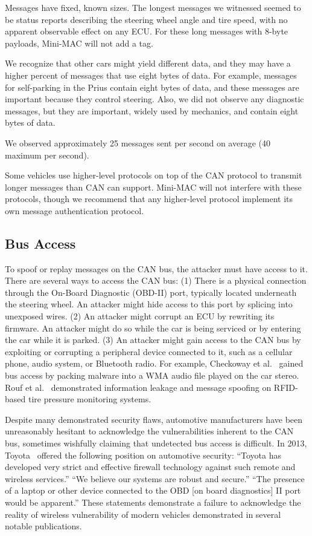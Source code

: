 Messages have fixed, known sizes.  The longest messages we witnessed
seemed to be status reports describing the steering wheel angle and tire speed,
with no apparent observable effect on any ECU.
For these long messages with 8-byte payloads,  Mini-MAC will not add a tag. 

We recognize that other cars might yield different data, and they may have a higher percent of
messages that use eight bytes of data.  For example, messages for
self-parking in the Prius contain eight bytes of data, and these messages are
important because they control steering. Also, we did not observe any diagnostic messages,
but they are important, widely used by mechanics, and contain eight bytes of data.

We observed approximately 25 messages sent per second on average (40 maximum per second).

Some vehicles use higher-level protocols on top of the 
CAN protocol to transmit longer messages than CAN can support. 
Mini-MAC will not interfere with these protocols, 
though we recommend that any higher-level 
protocol implement its own message authentication protocol.

\subsection{Bus Access}
\label{access}

To spoof or replay messages on the CAN bus, the attacker must have access to it.
There are several ways to access the CAN bus:  (1) There is a
physical connection through the On-Board Diagnostic (OBD-II) port, 
typically located underneath the steering wheel.  An attacker might hide
access to this port by splicing into unexposed wires.
(2) An attacker might corrupt an ECU by rewriting its firmware. An attacker might
do so while the car is being serviced or by entering the car while it is parked.
(3) An attacker might gain access to the CAN bus by exploiting or corrupting a peripheral
device connected to it, such as a cellular phone, audio system, or Bluetooth
radio.  For example, Checkoway et al.~\cite{Checkoway-2011} gained bus access by packing 
malware into a WMA audio file played on the car stereo. 
Rouf et al.~\cite{Rouf2010} demonstrated information leakage and message spoofing on RFID-based tire pressure monitoring systems.

Despite many demonstrated security flaws, automotive 
manufacturers have been unreasonably hesitant to acknowledge the vulnerabilities inherent to the CAN bus,
sometimes wishfully claiming that undetected bus access is difficult. 
In 2013, Toyota~\cite{bbc_toyota} offered the following position on automotive security: 
``Toyota has developed very strict and effective firewall technology against such remote and wireless services.'' 
``We believe our systems are robust and secure.'' 
``The presence of a laptop or other device connected to the OBD [on board diagnostics] II port would be apparent.'' 
These statements demonstrate a failure to acknowledge the 
reality of wireless vulnerability of modern vehicles demonstrated in several notable publications.

